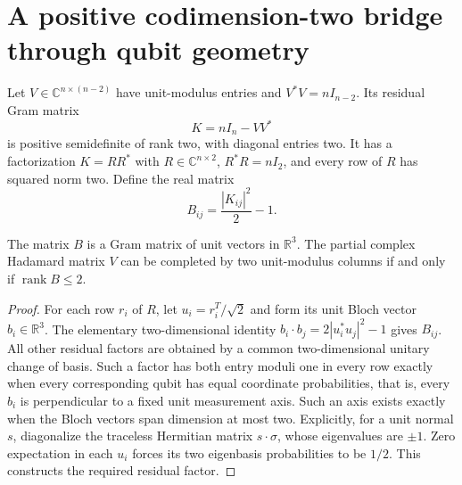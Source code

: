 \section{A positive codimension-two bridge through qubit geometry}
Let $V\in\mathbb C^{n\times(n-2)}$ have unit-modulus entries and
$V^*V=nI_{n-2}$. Its residual Gram matrix
\[
 K=nI_n-VV^*
\]
is positive semidefinite of rank two, with diagonal entries two.
It has a factorization $K=RR^*$ with $R\in\mathbb C^{n\times2}$,
$R^*R=nI_2$, and every row of $R$ has squared norm two.
Define the real matrix
\[
 B_{ij}=\frac{|K_{ij}|^2}{2}-1.
\]

\begin{theorem}
The matrix $B$ is a Gram matrix of unit vectors in $\mathbb R^3$.
The partial complex Hadamard matrix $V$ can be completed by two
unit-modulus columns if and only if $\operatorname{rank}B\le2$.
\end{theorem}
\begin{proof}
For each row $r_i$ of $R$, let $u_i=r_i^T/\sqrt2$ and form its unit
Bloch vector $b_i\in\mathbb R^3$. The elementary two-dimensional
identity $b_i\cdot b_j=2|u_i^*u_j|^2-1$ gives $B_{ij}$.
All other residual factors are obtained by a common two-dimensional
unitary change of basis. Such a factor has both entry moduli one
in every row exactly when every corresponding qubit has equal
coordinate probabilities, that is, every $b_i$ is perpendicular to
a fixed unit measurement axis. Such an axis exists exactly when
the Bloch vectors span dimension at most two. Explicitly, for a
unit normal $s$, diagonalize the traceless Hermitian matrix
$s\cdot\sigma$, whose eigenvalues are $\pm1$. Zero expectation in
each $u_i$ forces its two eigenbasis probabilities to be $1/2$.
This constructs the required residual factor.
\end{proof}

